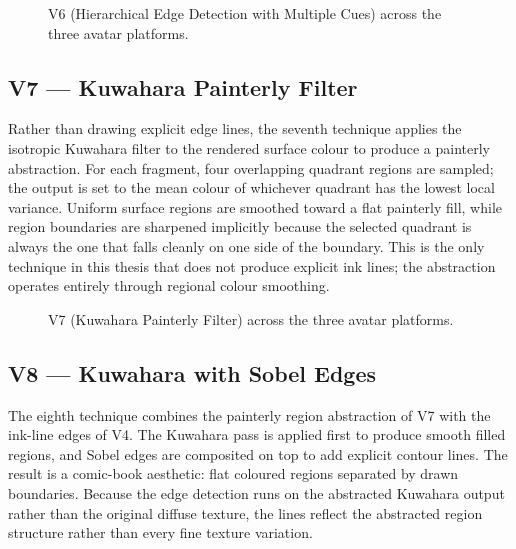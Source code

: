 \begin{figure}[H]
  \centering
  \caption{V6 (Hierarchical Edge Detection with Multiple Cues) across the three avatar platforms.}
  \label{fig:v6_platforms}
\end{figure}

\subsection{V7 — Kuwahara Painterly Filter}
\label{sec:v7}

Rather than drawing explicit edge lines, the seventh technique applies the isotropic Kuwahara filter to the rendered surface colour to produce a painterly abstraction. For each fragment, four overlapping quadrant regions are sampled; the output is set to the mean colour of whichever quadrant has the lowest local variance. Uniform surface regions are smoothed toward a flat painterly fill, while region boundaries are sharpened implicitly because the selected quadrant is always the one that falls cleanly on one side of the boundary. This is the only technique in this thesis that does not produce explicit ink lines; the abstraction operates entirely through regional colour smoothing.

\begin{figure}[H]
  \centering
  \caption{V7 (Kuwahara Painterly Filter) across the three avatar platforms.}
  \label{fig:v7_platforms}
\end{figure}

\subsection{V8 — Kuwahara with Sobel Edges}
\label{sec:v8}

The eighth technique combines the painterly region abstraction of V7 with the ink-line edges of V4. The Kuwahara pass is applied first to produce smooth filled regions, and Sobel edges are composited on top to add explicit contour lines. The result is a comic-book aesthetic: flat coloured regions separated by drawn boundaries. Because the edge detection runs on the abstracted Kuwahara output rather than the original diffuse texture, the lines reflect the abstracted region structure rather than every fine texture variation.

